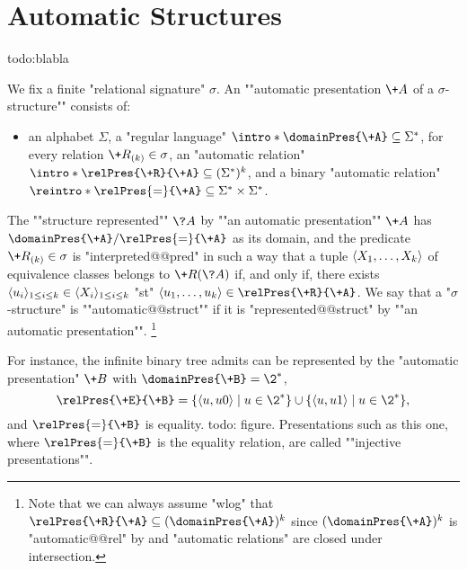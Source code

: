 \section{Automatic Structures}
\label{sec:preliminaries-automatic-structures-automatic-structures}

todo:blabla

We fix a finite "relational signature" $\sigma$.
An \AP""automatic presentation $\+A$ of a $\sigma$-structure"" consists of:
\begin{itemize}
	\item an alphabet $\Sigma$,
	\itemAP a "regular language" $\intro*\domainPres{\+A} \subseteq \Sigma^*$,
	\itemAP for every relation $\+R_{(k)} \in \sigma$, an
		"automatic relation" $\intro*\relPres{\+R}{\+A} \subseteq (\Sigma^*)^k$, and
	\itemAP a binary "automatic relation" $\reintro*\relPres{=}{\+A} \subseteq
		\Sigma^* \times \Sigma^*$. 
\end{itemize} 
The \AP""structure represented"" $\?A$ by ""an automatic presentation"" $\+A$ has
$\domainPres{\+A}/{\relPres{=}{\+A}}$ as its domain, and the predicate $\+R_{(k)} \in \sigma$
is "interpreted@@pred" in such a way that a tuple $\langle X_1,\hdots,X_k\rangle$ of equivalence classes
belongs to $\+R(\?A)$ if, and only if, there exists $\langle u_i\rangle_{1 \leq i \leq k} \in\langle X_i\rangle_{1 \leq i \leq k}$ "st" $\tup{u_1,\hdots,u_k} \in \relPres{\+R}{\+A}$.
We say that a "$\sigma$-structure" is ""automatic@@struct"" if it is
"represented@@struct" by ""an automatic presentation"".%
\footnote{Note that we can always assume "wlog" that $\relPres{\+R}{\+A} \subseteq
(\domainPres{\+A})^k$ since $(\domainPres{\+A})^k$ is "automatic@@rel" by
 and "automatic relations" are closed under intersection.}

For instance, the infinite binary tree admits can be represented by the "automatic presentation"
$\+B$ with $\domainPres{\+B} = \2^*$,
\[
	\relPres{\+E}{\+B} =
	\{\tup{u,u0} \mid u \in \2^*\} \cup \{\tup{u,u1} \mid u \in \2^*\},
\]
and $\relPres{=}{\+B}$ is equality.
todo: figure.
Presentations such as this one, where $\relPres{=}{\+B}$ is the equality relation,
are called ""injective presentations"".

